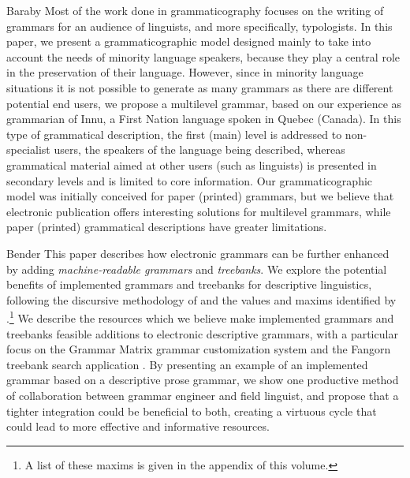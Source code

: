 Baraby
Most of the work done in grammaticography focuses on the writing of grammars for an audience of linguists, and more specifically, typologists. In this paper, we present a grammaticographic model designed mainly to take into account the needs of minority language speakers, because they play a central role in the preservation of their language. However, since in minority language situations it is not possible to generate as many grammars as there are different potential end users, we propose a multilevel grammar, based on our experience as grammarian of Innu, a First Nation language spoken in Quebec (Canada). In this type of grammatical description, the first (main) level is addressed to non-specialist users, the speakers of the language being described, whereas grammatical material aimed at other users (such as linguists) is presented in secondary levels and is limited to core information. Our grammaticographic model was initially conceived for paper (printed) grammars, but we believe that electronic publication offers interesting solutions for multilevel grammars, while paper (printed) grammatical descriptions have greater limitations.

Bender
This paper describes how electronic grammars can be further enhanced
by adding {\it machine-readable grammars} and {\it treebanks}.  We
explore the potential benefits of implemented grammars and treebanks
for descriptive linguistics, following the discursive methodology of
 and the values and maxims identified by
.\footnote{A
 list of these maxims is given in the appendix of this volume.
}
We describe the resources which we believe
make implemented grammars and treebanks feasible additions to
electronic descriptive grammars, with a particular focus on the
Grammar Matrix grammar customization system
\citep{Ben:Dre:Fok:Pou:Sal:10} and the Fangorn treebank search
application \citep{Gho:Bir:10}.  By presenting an example of an
implemented grammar based on a descriptive prose grammar, we show one
productive method of collaboration between grammar engineer and field
linguist, and propose that a tighter integration could be beneficial
to both, creating a virtuous cycle that could lead to more effective
and informative resources.

